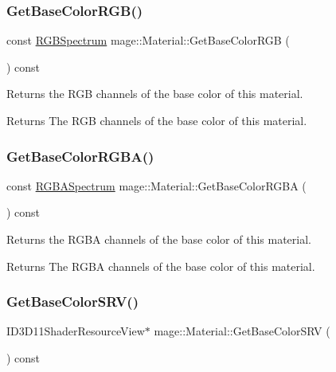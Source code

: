 \subsubsection{\texorpdfstring{Get\+Base\+Color\+R\+G\+B()}{GetBaseColorRGB()}}
{\footnotesize\ttfamily const \hyperlink{structmage_1_1_r_g_b_spectrum}{R\+G\+B\+Spectrum} mage\+::\+Material\+::\+Get\+Base\+Color\+R\+GB (\begin{DoxyParamCaption}{ }\end{DoxyParamCaption}) const\hspace{0.3cm}{\ttfamily [noexcept]}}

Returns the R\+GB channels of the base color of this material.

\begin{DoxyReturn}{Returns}
The R\+GB channels of the base color of this material. 
\end{DoxyReturn}
\hypertarget{structmage_1_1_material_ac79470bc12929841786bcc41fdd209d9}{}\label{structmage_1_1_material_ac79470bc12929841786bcc41fdd209d9} 
\subsubsection{\texorpdfstring{Get\+Base\+Color\+R\+G\+B\+A()}{GetBaseColorRGBA()}}
{\footnotesize\ttfamily const \hyperlink{structmage_1_1_r_g_b_a_spectrum}{R\+G\+B\+A\+Spectrum} mage\+::\+Material\+::\+Get\+Base\+Color\+R\+G\+BA (\begin{DoxyParamCaption}{ }\end{DoxyParamCaption}) const\hspace{0.3cm}{\ttfamily [noexcept]}}

Returns the R\+G\+BA channels of the base color of this material.

\begin{DoxyReturn}{Returns}
The R\+G\+BA channels of the base color of this material. 
\end{DoxyReturn}
\hypertarget{structmage_1_1_material_aef6ae5f87347d9e4bf798079aa906dd3}{}\label{structmage_1_1_material_aef6ae5f87347d9e4bf798079aa906dd3} 
\subsubsection{\texorpdfstring{Get\+Base\+Color\+S\+R\+V()}{GetBaseColorSRV()}}
{\footnotesize\ttfamily I\+D3\+D11\+Shader\+Resource\+View$\ast$ mage\+::\+Material\+::\+Get\+Base\+Color\+S\+RV (\begin{DoxyParamCaption}{ }\end{DoxyParamCaption}) const\hspace{0.3cm}{\ttfamily [noexcept]}}

